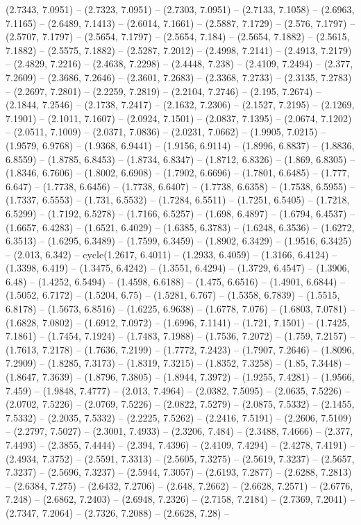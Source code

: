 (2.7343, 7.0951) -- (2.7323, 7.0951) -- (2.7303, 7.0951) -- (2.7133, 7.1058) -- (2.6963, 7.1165) -- (2.6489, 7.1413) -- (2.6014, 7.1661) -- (2.5887, 7.1729) -- (2.576, 7.1797) -- (2.5707, 7.1797) -- (2.5654, 7.1797) -- (2.5654, 7.184) -- (2.5654, 7.1882) -- (2.5615, 7.1882) -- (2.5575, 7.1882) -- (2.5287, 7.2012) -- (2.4998, 7.2141) -- (2.4913, 7.2179) -- (2.4829, 7.2216) -- (2.4638, 7.2298) -- (2.4448, 7.238) -- (2.4109, 7.2494) -- (2.377, 7.2609) -- (2.3686, 7.2646) -- (2.3601, 7.2683) -- (2.3368, 7.2733) -- (2.3135, 7.2783) -- (2.2697, 7.2801) -- (2.2259, 7.2819) -- (2.2104, 7.2746) -- (2.195, 7.2674) -- (2.1844, 7.2546) -- (2.1738, 7.2417) -- (2.1632, 7.2306) -- (2.1527, 7.2195) -- (2.1269, 7.1901) -- (2.1011, 7.1607) -- (2.0924, 7.1501) -- (2.0837, 7.1395) -- (2.0674, 7.1202) -- (2.0511, 7.1009) -- (2.0371, 7.0836) -- (2.0231, 7.0662) -- (1.9905, 7.0215) -- (1.9579, 6.9768) -- (1.9368, 6.9441) -- (1.9156, 6.9114) -- (1.8996, 6.8837) -- (1.8836, 6.8559) -- (1.8785, 6.8453) -- (1.8734, 6.8347) -- (1.8712, 6.8326) -- (1.869, 6.8305) -- (1.8346, 6.7606) -- (1.8002, 6.6908) -- (1.7902, 6.6696) -- (1.7801, 6.6485) -- (1.777, 6.647) -- (1.7738, 6.6456) -- (1.7738, 6.6407) -- (1.7738, 6.6358) -- (1.7538, 6.5955) -- (1.7337, 6.5553) -- (1.731, 6.5532) -- (1.7284, 6.5511) -- (1.7251, 6.5405) -- (1.7218, 6.5299) -- (1.7192, 6.5278) -- (1.7166, 6.5257) -- (1.698, 6.4897) -- (1.6794, 6.4537) -- (1.6657, 6.4283) -- (1.6521, 6.4029) -- (1.6385, 6.3783) -- (1.6248, 6.3536) -- (1.6272, 6.3513) -- (1.6295, 6.3489) -- (1.7599, 6.3459) -- (1.8902, 6.3429) -- (1.9516, 6.3425) -- (2.013, 6.342) -- cycle(1.2617, 6.4011) -- (1.2933, 6.4059) -- (1.3166, 6.4124) -- (1.3398, 6.419) -- (1.3475, 6.4242) -- (1.3551, 6.4294) -- (1.3729, 6.4547) -- (1.3906, 6.48) -- (1.4252, 6.5494) -- (1.4598, 6.6188) -- (1.475, 6.6516) -- (1.4901, 6.6844) -- (1.5052, 6.7172) -- (1.5204, 6.75) -- (1.5281, 6.767) -- (1.5358, 6.7839) -- (1.5515, 6.8178) -- (1.5673, 6.8516) -- (1.6225, 6.9638) -- (1.6778, 7.076) -- (1.6803, 7.0781) -- (1.6828, 7.0802) -- (1.6912, 7.0972) -- (1.6996, 7.1141) -- (1.721, 7.1501) -- (1.7425, 7.1861) -- (1.7454, 7.1924) -- (1.7483, 7.1988) -- (1.7536, 7.2072) -- (1.759, 7.2157) -- (1.7613, 7.2178) -- (1.7636, 7.2199) -- (1.7772, 7.2423) -- (1.7907, 7.2646) -- (1.8096, 7.2909) -- (1.8285, 7.3173) -- (1.8319, 7.3215) -- (1.8352, 7.3258) -- (1.85, 7.3448) -- (1.8647, 7.3639) -- (1.8796, 7.3805) -- (1.8944, 7.3972) -- (1.9255, 7.4281) -- (1.9566, 7.459) -- (1.9848, 7.4777) -- (2.013, 7.4964) -- (2.0382, 7.5095) -- (2.0635, 7.5226) -- (2.0702, 7.5226) -- (2.0769, 7.5226) -- (2.0822, 7.5279) -- (2.0875, 7.5332) -- (2.1455, 7.5332) -- (2.2035, 7.5332) -- (2.2225, 7.5262) -- (2.2416, 7.5191) -- (2.2606, 7.5109) -- (2.2797, 7.5027) -- (2.3001, 7.4933) -- (2.3206, 7.484) -- (2.3488, 7.4666) -- (2.377, 7.4493) -- (2.3855, 7.4444) -- (2.394, 7.4396) -- (2.4109, 7.4294) -- (2.4278, 7.4191) -- (2.4934, 7.3752) -- (2.5591, 7.3313) -- (2.5605, 7.3275) -- (2.5619, 7.3237) -- (2.5657, 7.3237) -- (2.5696, 7.3237) -- (2.5944, 7.3057) -- (2.6193, 7.2877) -- (2.6288, 7.2813) -- (2.6384, 7.275) -- (2.6432, 7.2706) -- (2.648, 7.2662) -- (2.6628, 7.2571) -- (2.6776, 7.248) -- (2.6862, 7.2403) -- (2.6948, 7.2326) -- (2.7158, 7.2184) -- (2.7369, 7.2041) -- (2.7347, 7.2064) -- (2.7326, 7.2088) -- (2.6628, 7.28) -- 